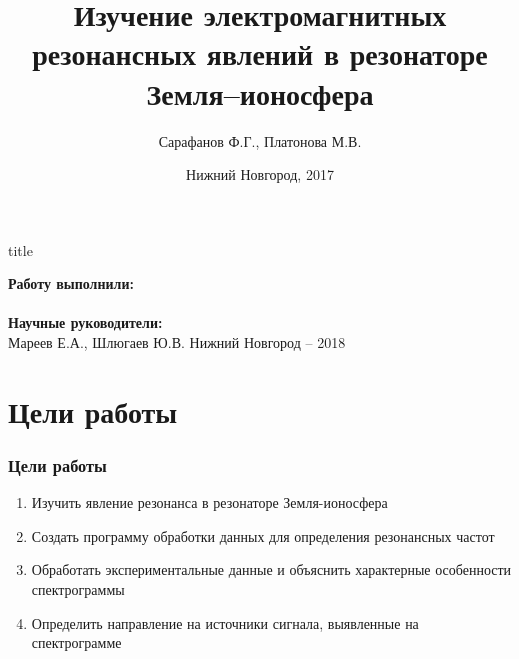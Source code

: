 \documentclass[10pt,pdf,hyperref={unicode}, dvipsnames]{beamer}
\title[]{Изучение электромагнитных резонансных явлений в резонаторе Земля--ионосфера}
\author{%
	Сарафанов Ф.Г., %
	Платонова М.В. %
}
\institute{Радиофизический факультет ННГУ, 420 группа}
\date{Нижний Новгород, 2017}
\begin{document}
  

\begin{frame}[plain]
	\centering
	\vspace{2cm}
	\begin{beamercolorbox}[sep=8pt,center]{title}
		\bf{}\inserttitle
	\end{beamercolorbox}
	\vspace{0.5cm}
	\normalsize \textbf{Работу выполнили:}\\
	\large\insertauthor\\ 
	\vspace{0.5cm}
	\normalsize{\textbf{Научные руководители:}\\}
	\large{Мареев Е.А., Шлюгаев Ю.В.}
	\vfill
	\small{Нижний Новгород -- 2018}
\end{frame}
\section{Цели работы}
\begin{frame}[t]
	\frametitle{Цели работы}
	\vfill
\begin{spacing}{1}
	\begin{enumerate}
		\item Изучить явление резонанса в резонаторе Земля-ионосфера
		\item Создать программу обработки данных для определения резонансных частот
		\item Обработать экспериментальные данные и объяснить характерные особенности спектрограммы  
		\item Определить направление на источники сигнала, выявленные на спектрограмме
	\end{enumerate}
\end{spacing}
	\vfill
\end{frame}
\end{document}

